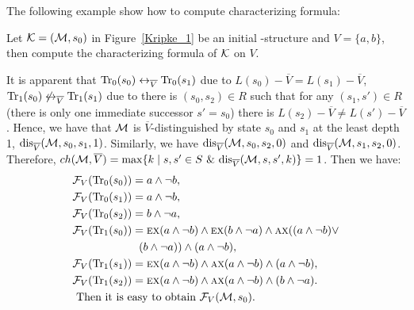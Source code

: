 \documentclass{article}
\begin{document}
The following example show how to compute characterizing formula:
\begin{example}
Let ${\cal K} = ({\cal M}, s_0)$ in Figure~\ref{Kripke_1} be an initial \MPK-structure and $V=\{a, b\}$, then compute the characterizing formula of ${\cal K}$ on $V$.

It is apparent that $\textrm{Tr}_0(s_0) \leftrightarrow_{\overline V} \textrm{Tr}_0(s_1)$ due to $L(s_0) - \overline V = L(s_1) -\overline V$, $\textrm{Tr}_1(s_0) \not\leftrightarrow_{\overline V} \textrm{Tr}_1(s_1)$ due to there is $(s_0, s_2)\in R$ such that for any $(s_1, s') \in R$ (there is only one immediate successor $s'=s_0$) there is $L(s_2) - \overline V \neq L(s') - \overline V$. Hence, we have that ${\cal M}$ is $\overline V$-distinguished by state $s_0$ and $s_1$ at the least depth 1, \ie $\textrm{dis}_{\overline V}({\cal M}, s_0, s_1, 1)$. Similarly, we have $\textrm{dis}_{\overline V}({\cal M}, s_0, s_2, 0)$ and $\textrm{dis}_{\overline V}({\cal M}, s_1, s_2, 0)$. Therefore, $ch({\cal M}, \overline V) =  \max\{k\mid s,s'\in S\ \&\ \textrm{dis}_{\overline V}({\cal M},s,s',k)\} = 1$.
Then we have:
\begin{align*}
  & {\cal F}_V(\textrm{Tr}_0(s_0)) = a \wedge \neg b, \\
  & {\cal F}_V(\textrm{Tr}_0(s_1)) = a \wedge \neg b, \\
  & {\cal F}_V(\textrm{Tr}_0(s_2)) = b \wedge \neg a, \\
  & {\cal F}_V(\textrm{Tr}_1(s_0)) = \textsc{e}\textsc{x}(a \wedge \neg b)  \wedge \textsc{e}\textsc{x}(b \wedge \neg a) \wedge \textsc{a}\textsc{x}((a \wedge \neg b) \vee\\
  & \qquad \qquad  \qquad (b \wedge \neg a)) \wedge (a \wedge \neg b), \\
  & {\cal F}_V(\textrm{Tr}_1(s_1)) = \textsc{e}\textsc{x}(a \wedge \neg b)  \wedge \textsc{a}\textsc{x}(a \wedge \neg b) \wedge (a \wedge \neg b), \\
  & {\cal F}_V(\textrm{Tr}_1(s_2)) = \textsc{e}\textsc{x}(a \wedge \neg b)  \wedge \textsc{a}\textsc{x}(a \wedge \neg b) \wedge (b \wedge \neg a).\\
  & \mbox{ Then it is easy to obtain\ } {\cal F}_V({\cal M}, s_0).
\end{align*}


\end{example}
\end{document}
